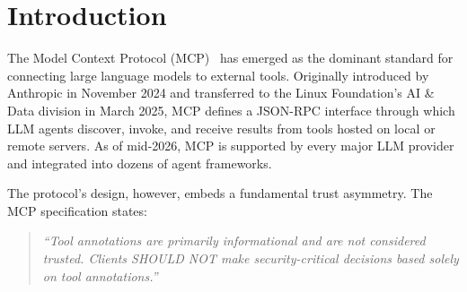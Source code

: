 \documentclass[letterpaper,twocolumn,10pt]{article}
\begin{document}
\begin{abstract}
We implement Trust by Replay in a production MCP server (233 tools as of 2026-04-20 --- see \texttt{docs/NUMBERS.md}; TypeScript,
WebGPU-accelerated solvers) and evaluate it on structural and thermal
simulation workloads. At $N{=}500$ timed iterations, contract enforcement
does not exhibit a stable positive overhead fraction relative to TET4 solver
wall-clock time; medians track V8/GC scheduling noise rather than a dominant
additive cost. Trace size scales linearly with simulation steps at
$\sim$282 bytes per entry (R$^2{=}1.000$; see \S\ref{sec:eval-scaling}).
Hash-chain verification runs in $O(n)$ time with
zero false positives and zero false negatives on our test suite. Full
simulation replay, the strongest verification mode, requires compute
proportional to the original execution but catches result-substitution attacks
that hash-only verification cannot. To our knowledge, this is the first
constructive solution to the tool result verification problem identified in
the MCP specification.
\end{abstract}


\section{Introduction}
\label{sec:intro}

The Model Context Protocol (MCP)~\cite{mcp-spec} has emerged as the dominant
standard for connecting large language models to external tools. Originally
introduced by Anthropic in November 2024 and transferred to the Linux
Foundation's AI \& Data division in March 2025, MCP defines a JSON-RPC
interface through which LLM agents discover, invoke, and receive results from
tools hosted on local or remote servers. As of mid-2026, MCP is supported by
every major LLM provider and integrated into dozens of agent frameworks.

The protocol's design, however, embeds a fundamental trust asymmetry. The MCP
specification states:

\begin{quote}
\emph{``Tool annotations are primarily informational and are not
  considered trusted. Clients SHOULD NOT make security-critical decisions
  based solely on tool annotations.''}~\cite{mcp-spec}
\end{quote}
\end{document}
